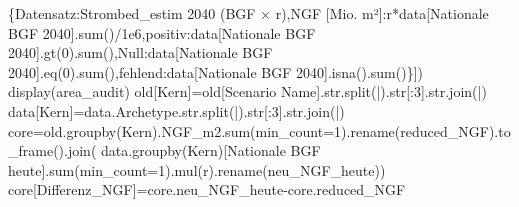\documentclass[
  ngerman,
  a4paper,
  DIV=11]{scrreprt}
\newenvironment{Shaded}{\begin{snugshade}}{\end{snugshade}}
\newcommand{\BuiltInTok}[1]{\textcolor[rgb]{0.00,0.23,0.31}{#1}}
\newcommand{\DecValTok}[1]{\textcolor[rgb]{0.68,0.00,0.00}{#1}}
\newcommand{\FloatTok}[1]{\textcolor[rgb]{0.68,0.00,0.00}{#1}}
\newcommand{\NormalTok}[1]{\textcolor[rgb]{0.00,0.23,0.31}{#1}}
\newcommand{\OperatorTok}[1]{\textcolor[rgb]{0.37,0.37,0.37}{#1}}
\newcommand{\StringTok}[1]{\textcolor[rgb]{0.13,0.47,0.30}{#1}}
\begin{document}
\begin{Shaded}
\begin{Highlighting}[]
\NormalTok{ \{}\StringTok{\textquotesingle{}Datensatz\textquotesingle{}}\NormalTok{:}\StringTok{\textquotesingle{}Strombed\_estim 2040 (BGF × r)\textquotesingle{}}\NormalTok{,}\StringTok{\textquotesingle{}NGF [Mio. m²]\textquotesingle{}}\NormalTok{:r}\OperatorTok{*}\NormalTok{data[}\StringTok{\textquotesingle{}Nationale BGF 2040\textquotesingle{}}\NormalTok{].}\BuiltInTok{sum}\NormalTok{()}\OperatorTok{/}\FloatTok{1e6}\NormalTok{,}\StringTok{\textquotesingle{}positiv\textquotesingle{}}\NormalTok{:data[}\StringTok{\textquotesingle{}Nationale BGF 2040\textquotesingle{}}\NormalTok{].gt(}\DecValTok{0}\NormalTok{).}\BuiltInTok{sum}\NormalTok{(),}\StringTok{\textquotesingle{}Null\textquotesingle{}}\NormalTok{:data[}\StringTok{\textquotesingle{}Nationale BGF 2040\textquotesingle{}}\NormalTok{].eq(}\DecValTok{0}\NormalTok{).}\BuiltInTok{sum}\NormalTok{(),}\StringTok{\textquotesingle{}fehlend\textquotesingle{}}\NormalTok{:data[}\StringTok{\textquotesingle{}Nationale BGF 2040\textquotesingle{}}\NormalTok{].isna().}\BuiltInTok{sum}\NormalTok{()\}])}
\NormalTok{display(area\_audit)}
\NormalTok{old[}\StringTok{\textquotesingle{}Kern\textquotesingle{}}\NormalTok{]}\OperatorTok{=}\NormalTok{old[}\StringTok{\textquotesingle{}Scenario Name\textquotesingle{}}\NormalTok{].}\BuiltInTok{str}\NormalTok{.split(}\StringTok{\textquotesingle{}|\textquotesingle{}}\NormalTok{).}\BuiltInTok{str}\NormalTok{[:}\DecValTok{3}\NormalTok{].}\BuiltInTok{str}\NormalTok{.join(}\StringTok{\textquotesingle{}|\textquotesingle{}}\NormalTok{)}
\NormalTok{data[}\StringTok{\textquotesingle{}Kern\textquotesingle{}}\NormalTok{]}\OperatorTok{=}\NormalTok{data.Archetype.}\BuiltInTok{str}\NormalTok{.split(}\StringTok{\textquotesingle{}|\textquotesingle{}}\NormalTok{).}\BuiltInTok{str}\NormalTok{[:}\DecValTok{3}\NormalTok{].}\BuiltInTok{str}\NormalTok{.join(}\StringTok{\textquotesingle{}|\textquotesingle{}}\NormalTok{)}
\NormalTok{core}\OperatorTok{=}\NormalTok{old.groupby(}\StringTok{\textquotesingle{}Kern\textquotesingle{}}\NormalTok{).NGF\_m2.}\BuiltInTok{sum}\NormalTok{(min\_count}\OperatorTok{=}\DecValTok{1}\NormalTok{).rename(}\StringTok{\textquotesingle{}reduced\_NGF\textquotesingle{}}\NormalTok{).to\_frame().join(}
\NormalTok{    data.groupby(}\StringTok{\textquotesingle{}Kern\textquotesingle{}}\NormalTok{)[}\StringTok{\textquotesingle{}Nationale BGF heute\textquotesingle{}}\NormalTok{].}\BuiltInTok{sum}\NormalTok{(min\_count}\OperatorTok{=}\DecValTok{1}\NormalTok{).mul(r).rename(}\StringTok{\textquotesingle{}neu\_NGF\_heute\textquotesingle{}}\NormalTok{))}
\NormalTok{core[}\StringTok{\textquotesingle{}Differenz\_NGF\textquotesingle{}}\NormalTok{]}\OperatorTok{=}\NormalTok{core.neu\_NGF\_heute}\OperatorTok{{-}}\NormalTok{core.reduced\_NGF}

\end{Highlighting}
\end{Shaded}
\end{document}
